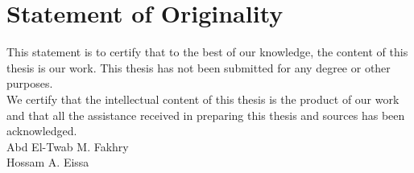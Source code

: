 \chapter*{Statement of Originality}

This statement is to certify that to the best of our knowledge, the content of this thesis is our work. This thesis has not been submitted for any degree or other purposes. \\[16pt]
We certify that the intellectual content of this thesis is the product of our work and that all the assistance received in preparing this thesis and sources has been acknowledged. \\[48pt]
Abd El-Twab M. Fakhry\\
Hossam A. Eissa
